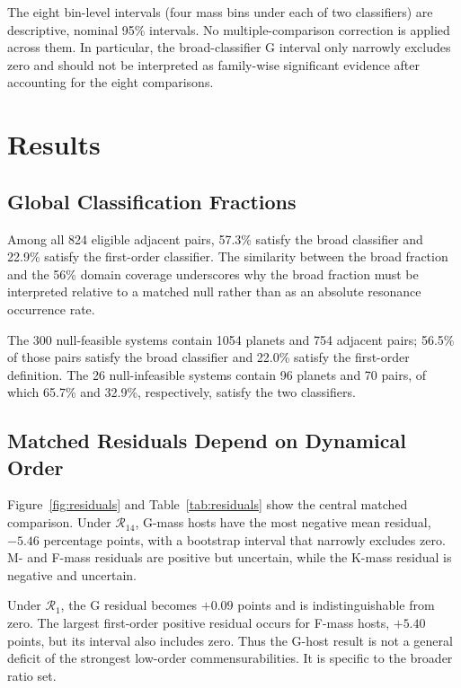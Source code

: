 \documentclass[twocolumn,linenumbers]{aastex631}
\begin{document}
The eight bin-level intervals (four mass bins under each of two classifiers)
are descriptive, nominal 95\% intervals. No multiple-comparison correction is
applied across them. In particular, the broad-classifier G interval only
narrowly excludes zero and should not be interpreted as family-wise
significant evidence after accounting for the eight comparisons.

\section{Results}

\subsection{Global Classification Fractions}

Among all 824 eligible adjacent pairs, 57.3\% satisfy the broad classifier and
22.9\% satisfy the first-order classifier. The similarity between the broad
fraction and the 56\% domain coverage underscores why the broad fraction must
be interpreted relative to a matched null rather than as an absolute resonance
occurrence rate.

The 300 null-feasible systems contain 1054 planets and 754 adjacent pairs;
56.5\% of those pairs satisfy the broad classifier and 22.0\% satisfy the
first-order definition. The 26 null-infeasible systems contain 96 planets and
70 pairs, of which 65.7\% and 32.9\%, respectively, satisfy the two
classifiers.

\subsection{Matched Residuals Depend on Dynamical Order}

Figure~\ref{fig:residuals} and Table~\ref{tab:residuals} show the central
matched comparison. Under $\mathcal{R}_{14}$, G-mass hosts have the most
negative mean residual, $-5.46$ percentage points, with a bootstrap interval
that narrowly excludes zero. M- and F-mass residuals are positive but
uncertain, while the K-mass residual is negative and uncertain.

Under $\mathcal{R}_1$, the G residual becomes $+0.09$ points and is
indistinguishable from zero. The largest first-order positive residual occurs
for F-mass hosts, $+5.40$ points, but its interval also includes zero. Thus the
G-host result is not a general deficit of the strongest low-order
commensurabilities. It is specific to the broader ratio set.
\end{document}
